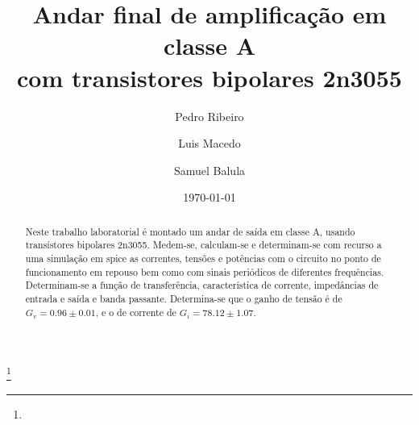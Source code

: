 \documentclass[%
  reprint,
  nofootinbib,
  amsmath,amssymb,
  aps,
  10pt,
  a4paper
]{revtex4-1}
\begin{document}


 

\title{Andar final de amplificação em classe A\\
com transistores bipolares 2n3055}
\thanks{}

\author{Pedro Ribeiro}%
\author{Luis Macedo}%
\author{Samuel Balula}%



\date{\today}
\begin{abstract}
Neste trabalho laboratorial é montado um andar de saída em classe A, usando transístores bipolares 2n3055.
Medem-se, calculam-se e determinam-se com recurso a uma simulação em spice as correntes, tensões e potências com o circuito no ponto de funcionamento em repouso bem como com sinais periódicos de diferentes frequências.
Determinam-se a função de transferência, característica de corrente, impedâncias de entrada e saída e banda passante.
Determina-se que o ganho de tensão é de $G_v=0.96\pm0.01$, e o de corrente de $G_i=78.12\pm1.07$.

\end{abstract}
\maketitle
\end{document}
